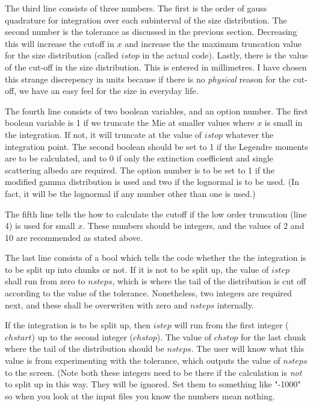 \begin{flushleft}
The third line consists of three numbers. The first is the order of gauss quadrature
for integration over each subinterval of the size distribution. The second
 number is the tolerance as 
discussed in the previous section. Decreasing this will increase the cutoff in $x$
and increase the the maximum truncation value for the size distribution (called $istop$
in the actual code). Lastly, there is the value of the cut-off in the size distribution.
This is entered in millimetres. I have chosen this strange discrepency in units
because if there is no {\it physical} reason for the cut-off, we have an easy feel
for the size in everyday life.
 

The fourth line consists of two boolean variables, and an option number.
 The first  boolean variable is 1 if
we truncate the Mie at smaller values where  $x$ is small in the integration.
If not, it will truncate at the value of $istop$ whatever the integration point.
The second boolean should be set to 1 if the Legendre moments are to be calculated,
and to 0 if only the extinction coefficient and single scattering albedo are required.
The option number is to be set to 1 if the modified gamma distribution is used
and two if the lognormal is to be used. (In fact, it will be the lognormal if
any number other than one is used.)

The fifth line tells the  how to calculate the cutoff if
the low order truncation (line 4) is used for small $x$. These numbers should be 
integers, and the values of 2 and 10 are recommended as stated above.

The last line consists of a bool which tells the code whether the the integration
is to be split up into chunks or not. If it is not to be split up, the value
of $istep$ shall run from zero to $nsteps$, which is where the tail of the 
distribution
is cut off according to the value of the tolerance. Nonetheless, two integers are
required next, and these shall be overwriten with zero and $nsteps$ internally.

If the integration is to be split up, then $istep$ will run from the first integer
($chstart$) up to the second integer ($chstop$). The value of $chstop$ for the
last chunk where the tail of the distribution should be $nsteps$. The user will
know what this value is from experimenting with the tolerance, which outputs
the value of $nsteps$ to the screen. (Note both these integers need to be
there if the calculation is {\it not} to split up in this way. They will be
ignored. Set them to something like "-1000" so when you look at the input files
you know the numbers mean nothing.


\end{flushleft}
